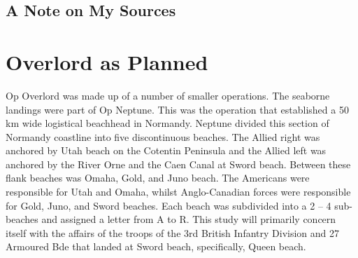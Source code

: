 \documentclass[noraggedright]{turabian-researchpaper}
\begin{document}
	
	\subsection{A Note on My Sources}
		



\section{Overlord as Planned} %






Op Overlord was made up of a number of smaller operations.  The seaborne
landings were part of Op Neptune.  This was the operation that established a
50 km wide logistical beachhead in Normandy.  Neptune divided this section of
Normandy coastline into five discontinuous beaches.  The Allied right was 
anchored by Utah beach on the Cotentin Peninsula and the Allied left was 
anchored by the River Orne and the Caen Canal at Sword beach.  Between
these flank beaches was Omaha, Gold, and Juno beach.  The Americans were 
responsible for Utah and Omaha, whilst Anglo-Canadian forces were responsible
for Gold, Juno, and Sword beaches.  Each beach was subdivided into a 2 -- 4
sub-beaches and assigned a letter from A to R.  This study will primarily 
concern itself with the affairs of the troops of the 3rd British Infantry 
Division and 27 Armoured Bde that landed at Sword beach, specifically, Queen 
beach.  
\end{document}

